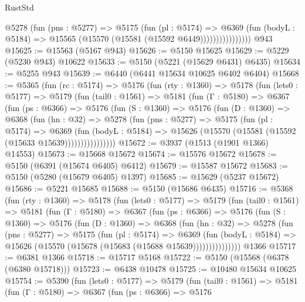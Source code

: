 \begin{lexlean}{RustStd}
\begin{coremodule}
                      @5278
                        (fun (pns : @5277) =>
                        @5175
                          (fun (pl : @5174) =>
                          @6369
                            (fun (bodyL : @5184) =>
                            @15565 (@15570 (@15581 (@15592 @6449))))))))))))))))
    @943
@15625 := @15563 (@5167 @943)
@15626 := @5150 @15625
@15629 := @5229 (@5230 @943) @10622
@15633 := @5150 (@5221 (@15629 @6431) @6435)
@15634 := @5255 @943
@15639 := @6440 (@6441 @15634 @10625 @6402 @6404)
@15668 := @5365
    (fun (rc : @5174) =>
    @5176
      (fun (rty : @1360) =>
      @5178
        (fun (lets0 : @5177) =>
        @5179
          (fun (tail0 : @1561) =>
          @5181
            (fun (Γ : @5180) =>
            @6367
              (fun (ps : @6366) =>
              @5176
                (fun (S : @1360) =>
                @5176
                  (fun (D : @1360) =>
                  @6368
                    (fun (hn : @32) =>
                    @5278
                      (fun (pns : @5277) =>
                      @5175
                        (fun (pl : @5174) =>
                        @6369
                          (fun (bodyL : @5184) =>
                          @15626 (@15570 (@15581 (@15592 (@15633 @15639))))))))))))))))
@15672 := @3937 (@1513 (@1901 @1366) @14553)
@15673 := @15668 @15672
@15674 := @15576 @15672
@15678 := @5150 (@6391 (@15674 @6405) @6412)
@15679 := @15587 @15672
@15683 := @5150 (@5280 (@15679 @6405) @1397)
@15685 := @15629 (@5237 @15672)
@15686 := @5221 @15685
@15688 := @5150 (@15686 @6435)
@15716 := @5368
    (fun (rty : @1360) =>
    @5178
      (fun (lets0 : @5177) =>
      @5179
        (fun (tail0 : @1561) =>
        @5181
          (fun (Γ : @5180) =>
          @6367
            (fun (ps : @6366) =>
            @5176
              (fun (S : @1360) =>
              @5176
                (fun (D : @1360) =>
                @6368
                  (fun (hn : @32) =>
                  @5278
                    (fun (pns : @5277) =>
                    @5175
                      (fun (pl : @5174) =>
                      @6369
                        (fun (bodyL : @5184) =>
                        @15626 (@15570 (@15678 (@15683 (@15688 @15639)))))))))))))))
    @1366
@15717 := @6381 @1366
@15718 := @15717 @5168
@15722 := @5150 (@15568 (@6378 (@6380 @15718)))
@15723 := @6438 @10478
@15725 := @10480 @15634 @10625
@15754 := @5390
    (fun (lets0 : @5177) =>
    @5179
      (fun (tail0 : @1561) =>
      @5181
        (fun (Γ : @5180) =>
        @6367
          (fun (ps : @6366) =>
          @5176

\end{coremodule}
\end{lexlean}
